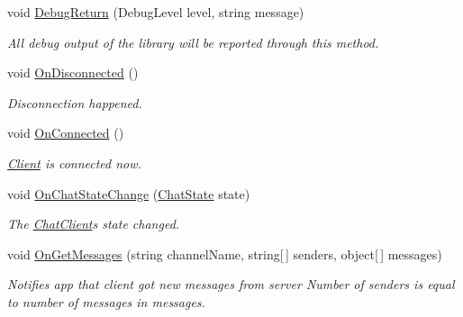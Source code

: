 \begin{DoxyCompactItemize}
\item 
void \hyperlink{interface_exit_games_1_1_client_1_1_photon_1_1_chat_1_1_i_chat_client_listener_ae4c3e779b7761f6a254231b9775fabcf}{Debug\+Return} (Debug\+Level level, string message)
\begin{DoxyCompactList}\small\item\em All debug output of the library will be reported through this method. \end{DoxyCompactList}\item 
void \hyperlink{interface_exit_games_1_1_client_1_1_photon_1_1_chat_1_1_i_chat_client_listener_a601455f328ead10ff4b8be9a30698170}{On\+Disconnected} ()
\begin{DoxyCompactList}\small\item\em Disconnection happened. \end{DoxyCompactList}\item 
void \hyperlink{interface_exit_games_1_1_client_1_1_photon_1_1_chat_1_1_i_chat_client_listener_af843b2308e71621bedf3d8ee060eb1cc}{On\+Connected} ()
\begin{DoxyCompactList}\small\item\em \hyperlink{namespace_exit_games_1_1_client}{Client} is connected now. \end{DoxyCompactList}\item 
void \hyperlink{interface_exit_games_1_1_client_1_1_photon_1_1_chat_1_1_i_chat_client_listener_aafb9a56eee22abe2c728d643629e8c28}{On\+Chat\+State\+Change} (\hyperlink{namespace_exit_games_1_1_client_1_1_photon_1_1_chat_ad7d7f22d8741237f41e4b60779cdfa19}{Chat\+State} state)
\begin{DoxyCompactList}\small\item\em The \hyperlink{class_exit_games_1_1_client_1_1_photon_1_1_chat_1_1_chat_client}{Chat\+Client}\textquotesingle{}s state changed. \end{DoxyCompactList}\item 
void \hyperlink{interface_exit_games_1_1_client_1_1_photon_1_1_chat_1_1_i_chat_client_listener_a84ca1d0eee402e737803930a6ee6ec73}{On\+Get\+Messages} (string channel\+Name, string\mbox{[}$\,$\mbox{]} senders, object\mbox{[}$\,$\mbox{]} messages)
\begin{DoxyCompactList}\small\item\em Notifies app that client got new messages from server Number of senders is equal to number of messages in \textquotesingle{}messages\textquotesingle{}. \end{DoxyCompactList}\item 

\end{DoxyCompactItemize}

